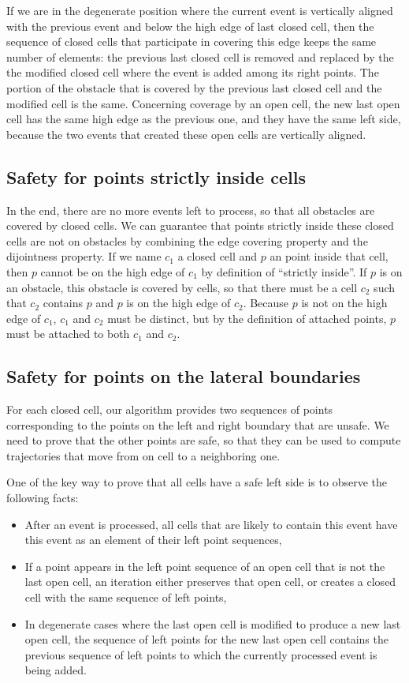 \documentclass[a4paper, USenglish, cleveref, autoref, thm-restate]{lipics-v2021}
\begin{document}
If we are in the degenerate position where the current event is
vertically aligned with the previous event and below the high edge of
last closed cell, then the sequence of closed cells that participate
in covering this edge keeps the same number of elements: the previous last
closed cell is removed and replaced by the the modified closed cell
where the event is added among its right points.  The portion of the
obstacle that is covered by the previous last closed cell and the
modified cell is the same.  Concerning coverage by an open cell, the
new last open cell has the same high edge as the previous one, and
they have the same left side, because the two events that created
these open cells are vertically aligned.
\subsection{Safety for points strictly inside cells}
In the end, there are no more events left to process, so that all
obstacles are covered by closed cells.  
We can guarantee that points strictly inside these closed cells are not
on obstacles by combining the edge covering property and the
dijointness property.  If we name \(c_1\) a closed cell and \(p\) an
point inside that cell, then \(p\) cannot be on the high edge of
\(c_1\) by definition of ``strictly inside''.  If \(p\) is on an
obstacle, this obstacle is covered by cells, so that there must be a
cell \(c_2\) such that \(c_2\) contains \(p\) and \(p\) is on the high
edge of \(c_2\).  Because \(p\) is not on the high edge of \(c_1\),
\(c_1\) and \(c_2\) must be distinct, but by the definition of
attached points, \(p\) must be attached to both \(c_1\) and \(c_2\).
\subsection{Safety for points on the lateral boundaries}
For each closed cell, our algorithm provides two sequences of points
corresponding to the points on the left and right boundary that are
unsafe.  We need to prove that the other points are safe, so that they
can be used to compute trajectories that move from on cell to a
neighboring one.

One of the key way to prove that all cells have a safe left side is to
observe the following facts:
\begin{itemize}
\item After an event is processed, all cells that are likely to
  contain this event have this event as an element of their left point
  sequences,
\item If a point appears in the left point sequence of an open cell
  that is not the last open cell, an iteration either preserves that
  open cell, or creates a closed cell with the same sequence of left
  points,
\item In degenerate cases where the last open cell is modified to
  produce a new last open cell, the sequence of left points for the
  new last open cell contains the previous sequence of left points to
  which the currently processed event is being added.
\end{itemize}
\end{document}
